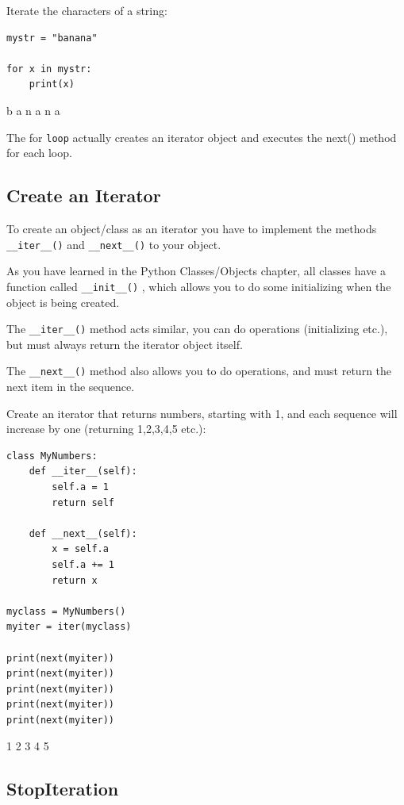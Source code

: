 \documentclass[12pt,a4paper]{article}
\newcommand{\code}[1]{%
	\colorbox{backcolour}{\lstinline{#1}}%
}
\begin{document}
\begin{ebox}
Iterate the characters of a string:
	\begin{lstlisting}
mystr = "banana"

for x in mystr:
    print(x)
	\end{lstlisting}
\tcblower
	\begin{vercode}
b
a
n
a
n
a
	\end{vercode}
\end{ebox}

The for \code{loop} actually creates an iterator object and executes the
next() method for each loop.
\subsection{Create an Iterator}

To create an object/class as an iterator you have to implement the methods
\code{__iter__()} and \code{__next__()} to your object.

As you have learned in the Python Classes/Objects chapter, all classes
have a function called \code{__init__()}, which allows you to do some
initializing when the object is being created.

The \code{__iter__()} method acts similar, you can do operations
(initializing etc.), but must always return the iterator object itself.

The \code{__next__()} method also allows you to do operations, and must
return the next item in the sequence.

\begin{ebox}
Create an iterator that returns numbers, starting with 1, and each
sequence will increase by one (returning 1,2,3,4,5 etc.):
	\begin{lstlisting}
class MyNumbers:
    def __iter__(self):
        self.a = 1
        return self

    def __next__(self):
        x = self.a
        self.a += 1
        return x

myclass = MyNumbers()
myiter = iter(myclass)

print(next(myiter))
print(next(myiter))
print(next(myiter))
print(next(myiter))
print(next(myiter))
	\end{lstlisting}
\tcblower
	\begin{vercode}
1
2
3
4
5
	\end{vercode}
\end{ebox}
\subsection{StopIteration}
\end{document}
